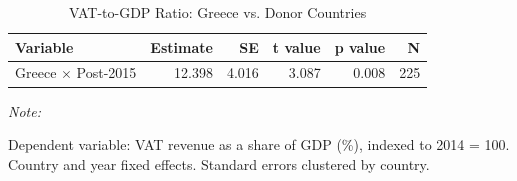 \begin{table}[!h]
\centering
\caption{\label{tab:tab5b}VAT-to-GDP Ratio: Greece vs. Donor Countries}
\centering
\begin{threeparttable}
\begin{tabular}[t]{lrrrrr}
\toprule
Variable & Estimate & SE & t value & p value & N\\
\midrule
Greece $\times$ Post-2015 & 12.398 & 4.016 & 3.087 & 0.008 & 225\\
\bottomrule
\end{tabular}
\begin{tablenotes}
\item \textit{Note: } 
\item Dependent variable: VAT revenue as a share of GDP (\%), indexed to 2014 = 100. Country and year fixed effects. Standard errors clustered by country.
\end{tablenotes}
\end{threeparttable}
\end{table}
